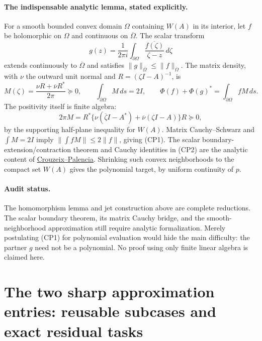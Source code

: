 \documentclass[11pt,a4paper]{article}
\theoremstyle{definition}
\begin{document}
\paragraph{The indispensable analytic lemma, stated explicitly.}
For a smooth bounded convex domain $\Omega$ containing $W(A)$ in its
interior, let $f$ be holomorphic on $\Omega$ and continuous on
$\overline\Omega$. The scalar transform
\[
 g(z)=\frac1{2\pi i}\int_{\partial\Omega}
             \frac{\overline{f(\zeta)}}{\zeta-z}\,d\zeta
\]
extends continuously to $\overline\Omega$ and satisfies
$\|g\|_{\overline\Omega}\le\|f\|_{\overline\Omega}$.
The matrix density, with $\nu$ the outward unit normal and
$R=(\zeta I-A)^{-1}$, is
\[
 M(\zeta)=\frac{\nu R+\overline\nu R^*}{2\pi}\succeq0,
 \qquad \int_{\partial\Omega}M\,ds=2I,
 \qquad \Phi(f)+\Phi(g)^*=\int_{\partial\Omega}fM\,ds.
                                                        \tag{CP2}
\]
The positivity itself is finite algebra:
\[
 2\pi M
 =R^*\{\nu(\overline\zeta I-A^*)+
                 \overline\nu(\zeta I-A)\}R\succeq0,
\]
by the supporting half-plane inequality for $W(A)$.
Matrix Cauchy--Schwarz and $\int M=2I$ imply
$\|\int fM\|\le2\|f\|$, giving (CP1).
The scalar boundary-extension/contraction theorem and Cauchy identities
in (CP2) are the analytic content of
\href{https://arxiv.org/abs/1702.00668}{Crouzeix--Palencia}.
Shrinking such convex neighborhoods to the compact set $W(A)$ gives
the polynomial target, by uniform continuity of $p$.

\paragraph{Audit status.}
The homomorphism lemma and jet construction above are complete
reductions. The scalar boundary theorem, its matrix Cauchy bridge,
and the smooth-neighborhood approximation still require analytic
formalization. Merely postulating (CP1) for polynomial evaluation
would hide the main difficulty: the partner $g$ need not be a
polynomial. No proof using only finite linear algebra is claimed here.

\section{The two sharp approximation entries: reusable subcases and exact residual tasks}
\label{math:sharp}
\end{document}
